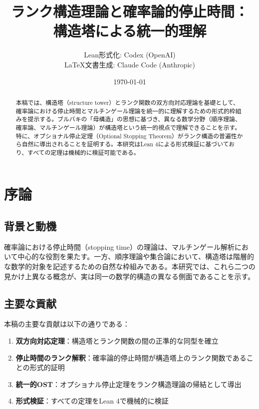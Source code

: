 \documentclass[a4paper,11pt]{ltjsarticle}
\title{ランク構造理論と確率論的停止時間：\\構造塔による統一的理解}
\author{Lean形式化: Codex (OpenAI) \\ \LaTeX 文書生成: Claude Code (Anthropic)}
\date{\today}
\theoremstyle{definition}
\begin{document}
\maketitle

\begin{abstract}
本稿では、構造塔（structure tower）とランク関数の双方向対応理論を基礎として、確率論における停止時間とマルチンゲール理論を統一的に理解するための形式的枠組みを提示する。ブルバキの「母構造」の思想に基づき、異なる数学分野（順序理論、確率論、マルチンゲール理論）が構造塔という統一的視点で理解できることを示す。特に、オプショナル停止定理（Optional Stopping Theorem）がランク構造の普遍性から自然に導出されることを証明する。本研究はLean 4による形式検証に基づいており、すべての定理は機械的に検証可能である。
\end{abstract}

\tableofcontents

\section{序論}

\subsection{背景と動機}

確率論における停止時間（stopping time）の理論は、マルチンゲール解析において中心的な役割を果たす。一方、順序理論や集合論において、構造塔は階層的な数学的対象を記述するための自然な枠組みである。本研究では、これら二つの見かけ上異なる概念が、実は同一の数学的構造の異なる側面であることを示す。

\subsection{主要な貢献}

本稿の主要な貢献は以下の通りである：

\begin{enumerate}[label=(\arabic*)]
\item \textbf{双方向対応定理}：構造塔とランク関数の間の正準的な同型を確立
\item \textbf{停止時間のランク解釈}：確率論的停止時間が構造塔上のランク関数であることの形式的証明
\item \textbf{統一的OST}：オプショナル停止定理をランク構造理論の帰結として導出
\item \textbf{形式検証}：すべての定理をLean 4で機械的に検証
\end{enumerate}
\end{document}
